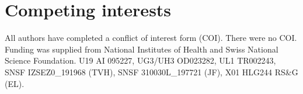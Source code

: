 \documentclass[9pt,lineno]{elife}  %
\begin{document}
\section*{Competing interests}
All authors have completed a conflict of interest form (COI). 
There were no COI. 
Funding was supplied from National Institutes of Health 
and Swiss National Science Foundation.
U19 AI 095227, UG3/UH3 OD023282, UL1 TR002243, SNSF IZSEZ0\_191968   (TVH), SNSF 310030L\_197721 (JF), X01 HLG244 RS\&G (EL).

%



%
%
%
%
%
%
%
%
%
\end{document}
